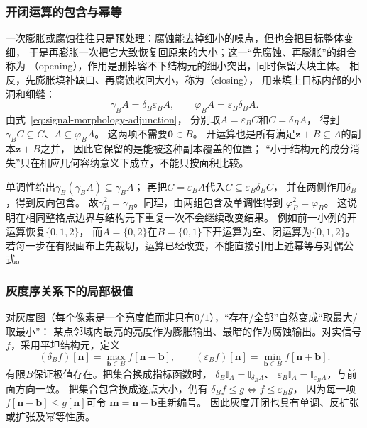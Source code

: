 \subsubsection{开闭运算的包含与幂等}
一次膨胀或腐蚀往往只是预处理：腐蚀能去掉细小的噪点，但也会把目标整体变细，
于是再膨胀一次把它大致恢复回原来的大小；这一“先腐蚀、再膨胀”的组合称为
（opening），作用是删掉容不下结构元的细小突出，同时保留大块主体。
相反，先膨胀填补缺口、再腐蚀收回大小，称为（closing），
用来填上目标内部的小洞和细缝：
\begin{equation}
 \gamma_B A=\delta_B\varepsilon_B A,\qquad
 \varphi_B A=\varepsilon_B\delta_B A.
 \label{eq:signal-morphology-opening-closing}
\end{equation}
由式~\eqref{eq:signal-morphology-adjunction}，
分别取$A=\varepsilon_B C$和$C=\delta_B A$，
得到$\gamma_B C\subseteq C$、$A\subseteq\varphi_B A$。
这两项不需要$\bm0\in B$。
开运算也是所有满足$\bm z+B\subseteq A$的副本$\bm z+B$之并，
因此它保留的是能被这种副本覆盖的位置；
“小于结构元的成分消失”只在相应几何容纳意义下成立，不能只按面积比较。

单调性给出$\gamma_B(\gamma_B A)\subseteq\gamma_B A$；
再把$C=\varepsilon_B A$代入$C\subseteq\varepsilon_B\delta_B C$，
并在两侧作用$\delta_B$，得到反向包含。
故$\gamma_B^2=\gamma_B$。同理，由两组包含及单调性得到
$\varphi_B^2=\varphi_B$。
这说明在相同整格点边界与结构元下重复一次不会继续改变结果。
例如前一小例的开运算恢复$\{0,1,2\}$，
而$A=\{0,2\}$在$B=\{0,1\}$下开运算为空、闭运算为$\{0,1,2\}$。
若每一步在有限画布上先裁切，运算已经改变，不能直接引用上述幂等与对偶公式。

\subsubsection{灰度序关系下的局部极值}
对灰度图（每个像素是一个亮度值而非只有$0/1$），“存在/全部”自然变成“取最大/取最小”：
某点邻域内最亮的亮度作为膨胀输出、最暗的作为腐蚀输出。对实信号$f$，采用平坦结构元，定义
\begin{equation}
 (\delta_Bf)[\bm n]=\max_{\bm b\in B}f[\bm n-\bm b],\qquad
 (\varepsilon_Bf)[\bm n]=\min_{\bm b\in B}f[\bm n+\bm b].
 \label{eq:signal-grayscale-morphology}
\end{equation}
有限$B$保证极值存在。把集合换成指标函数时，
$\delta_B\mathbb I_A=\mathbb I_{\delta_B A}$、
$\varepsilon_B\mathbb I_A=\mathbb I_{\varepsilon_B A}$，与前面方向一致。
把集合包含换成逐点大小，仍有
$\delta_Bf\leq g\Longleftrightarrow f\leq\varepsilon_Bg$，
因为每一项$f[\bm n-\bm b]\leq g[\bm n]$可令
$\bm m=\bm n-\bm b$重新编号。
因此灰度开闭也具有单调、反扩张或扩张及幂等性质。


